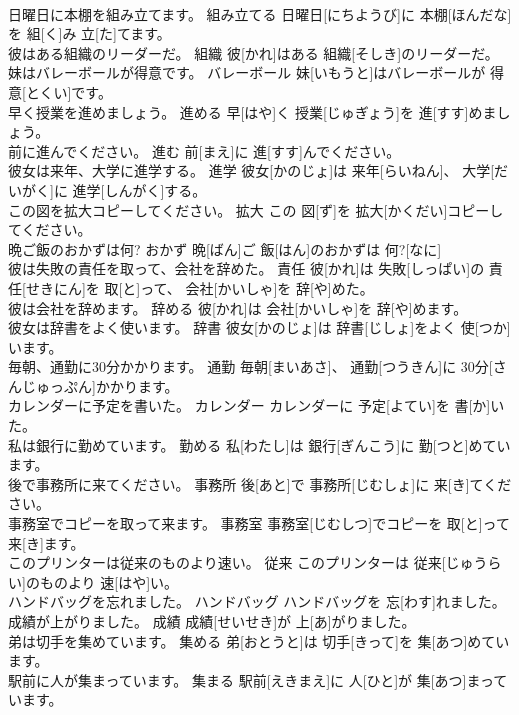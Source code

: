\documentclass[8pt]{extreport}
\begin{document}
\begin{CJK}{UTF8}{min}
\\	日曜日に本棚を組み立てます。	組み立てる	日曜日[にちようび]に 本棚[ほんだな]を 組[く]み 立[た]てます。	
\\	彼はある組織のリーダーだ。	組織	彼[かれ]はある 組織[そしき]のリーダーだ。	
\\	妹はバレーボールが得意です。	バレーボール	妹[いもうと]はバレーボールが 得意[とくい]です。	
\\	早く授業を進めましょう。	進める	早[はや]く 授業[じゅぎょう]を 進[すす]めましょう。	
\\	前に進んでください。	進む	前[まえ]に 進[すす]んでください。	
\\	彼女は来年、大学に進学する。	進学	彼女[かのじょ]は 来年[らいねん]、 大学[だいがく]に 進学[しんがく]する。	
\\	この図を拡大コピーしてください。	拡大	この 図[ず]を 拡大[かくだい]コピーしてください。	
\\	晩ご飯のおかずは何?	おかず	晩[ばん]ご 飯[はん]のおかずは 何?[なに]	
\\	彼は失敗の責任を取って、会社を辞めた。	責任	彼[かれ]は 失敗[しっぱい]の 責任[せきにん]を 取[と]って、 会社[かいしゃ]を 辞[や]めた。	
\\	彼は会社を辞めます。	辞める	彼[かれ]は 会社[かいしゃ]を 辞[や]めます。	
\\	彼女は辞書をよく使います。	辞書	彼女[かのじょ]は 辞書[じしょ]をよく 使[つか]います。	
\\	毎朝、通勤に30分かかります。	通勤	毎朝[まいあさ]、 通勤[つうきん]に 30分[さんじゅっぷん]かかります。	
\\	カレンダーに予定を書いた。	カレンダー	カレンダーに 予定[よてい]を 書[か]いた。	
\\	私は銀行に勤めています。	勤める	私[わたし]は 銀行[ぎんこう]に 勤[つと]めています。	
\\	後で事務所に来てください。	事務所	後[あと]で 事務所[じむしょ]に 来[き]てください。	
\\	事務室でコピーを取って来ます。	事務室	事務室[じむしつ]でコピーを 取[と]って 来[き]ます。	
\\	このプリンターは従来のものより速い。	従来	このプリンターは 従来[じゅうらい]のものより 速[はや]い。	
\\	ハンドバッグを忘れました。	ハンドバッグ	ハンドバッグを 忘[わす]れました。	
\\	成績が上がりました。	成績	成績[せいせき]が 上[あ]がりました。	
\\	弟は切手を集めています。	集める	弟[おとうと]は 切手[きって]を 集[あつ]めています。	
\\	駅前に人が集まっています。	集まる	駅前[えきまえ]に 人[ひと]が 集[あつ]まっています。	

\end{CJK}
\end{document}
